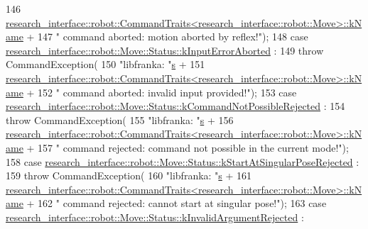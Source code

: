 \begin{DoxyCode}
146           
      \hyperlink{structresearch__interface_1_1robot_1_1CommandTraits}{research\_interface::robot::CommandTraits<research\_interface::robot::Move>::kName}
       +
147           \textcolor{stringliteral}{" command aborted: motion aborted by reflex!"});
148     \textcolor{keywordflow}{case} \hyperlink{structresearch__interface_1_1robot_1_1Move_a74e15d249324a1b2d28f0a7cf50dc794acfa49311eb3442e8f47f921b951ef1eb}{research\_interface::robot::Move::Status::kInputErrorAborted}
      :
149       \textcolor{keywordflow}{throw} CommandException(
150           \textcolor{stringliteral}{"libfranka: "}\hyperlink{namespaceservice__node__3_aa976421a49e0b54f23833423400849ae}{s} +
151           
      \hyperlink{structresearch__interface_1_1robot_1_1CommandTraits}{research\_interface::robot::CommandTraits<research\_interface::robot::Move>::kName}
       +
152           \textcolor{stringliteral}{" command aborted: invalid input provided!"});
153     \textcolor{keywordflow}{case} \hyperlink{structresearch__interface_1_1robot_1_1Move_a74e15d249324a1b2d28f0a7cf50dc794a168d00b46403240019d0b42f5a116cdd}{research\_interface::robot::Move::Status::kCommandNotPossibleRejected}
      :
154       \textcolor{keywordflow}{throw} CommandException(
155           \textcolor{stringliteral}{"libfranka: "}\hyperlink{namespaceservice__node__3_aa976421a49e0b54f23833423400849ae}{s} +
156           
      \hyperlink{structresearch__interface_1_1robot_1_1CommandTraits}{research\_interface::robot::CommandTraits<research\_interface::robot::Move>::kName}
       +
157           \textcolor{stringliteral}{" command rejected: command not possible in the current mode!"});
158     \textcolor{keywordflow}{case} \hyperlink{structresearch__interface_1_1robot_1_1Move_a74e15d249324a1b2d28f0a7cf50dc794ab6f94a8373495e5b2c77367f22b7f560}{research\_interface::robot::Move::Status::kStartAtSingularPoseRejected}
      :
159       \textcolor{keywordflow}{throw} CommandException(
160           \textcolor{stringliteral}{"libfranka: "}\hyperlink{namespaceservice__node__3_aa976421a49e0b54f23833423400849ae}{s} +
161           
      \hyperlink{structresearch__interface_1_1robot_1_1CommandTraits}{research\_interface::robot::CommandTraits<research\_interface::robot::Move>::kName}
       +
162           \textcolor{stringliteral}{" command rejected: cannot start at singular pose!"});
163     \textcolor{keywordflow}{case} \hyperlink{structresearch__interface_1_1robot_1_1Move_a74e15d249324a1b2d28f0a7cf50dc794a9328e3d4adcd129e286cd0e65a9d4a1c}{research\_interface::robot::Move::Status::kInvalidArgumentRejected}
      :

\end{DoxyCode}
